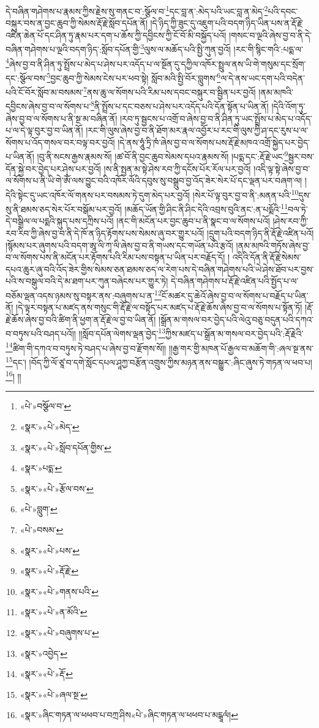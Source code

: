 དེ་བཞིན་གཤེགས་པ་རྣམས་ཀྱིས་རྗེས་སུ་གནང་བ་:སྩོལ་བ་\footnote{«པེ་»བསྩོལ་བ་}དང་བླ་ན་:མེད་པའི་ཡང་བླ་ན་མེད་\footnote{«སྣར་»«པེ་»མེད་}པའི་དབང་བསྐུར་བས་ན་བྱང་ཆུབ་ཀྱི་སེམས་རྡོ་རྗེ་སློབ་དཔོན་ནོ། །དེ་ཉིད་ཀྱི་ཟུང་དུ་འཇུག་པའི་བདག་ཉིད་ཡིན་པས་ན་རྡོ་རྗེ་འཛིན་ཆེན་པོ་དང་ཤིན་ཏུ་རྣམ་པར་དག་པ་ཆོས་ཀྱི་དབྱིངས་ཀྱི་ངོ་བོ་མི་བསྐྱོད་པའོ། །གསང་བ་ལྔའི་ཞེས་བྱ་བ་ནི་དེ་བཞིན་གཤེགས་པ་ལྔའི་བདག་ཉིད་:སློབ་དཔོན་གྱི་\footnote{«སྣར་»«པེ་»སློབ་དཔོན་གྱིས་}ལུས་ལ་མཆོད་པའི་སྤྱི་ཀུན་བྱའོ། །རང་གི་སྙིང་གའི་:པདྨ་ལ་\footnote{«སྣར་»པདྨ་}ཞེས་བྱ་བ་ནི་ཤིན་ཏུ་སྤྲོས་པ་མེད་པ་ཤེས་པར་འདོད་པ་ལ་སྔོན་དུ་དཀྱིལ་འཁོར་སྤྲུལ་ནས་ཡི་གེ་གསུམ་དང་སྲོག་དང་:སྩོལ་བས་\footnote{«སྣར་»«པེ་»རྩོལ་བས་}བྱང་ཆུབ་ཀྱི་སེམས་ངེས་པར་ཕབ་སྟེ། སློབ་མའི་སྤྱི་བོར་བླུགས་\footnote{«པེ་»བླུག་}ལ་དེ་ནས་ཡང་དག་པའི་བདེན་པའི་ངོ་བོར་སློབ་མ་བསམས་\footnote{«པེ་»བསམ་}ནས་ཆུ་ལ་སོགས་པའི་རིམ་པས་དབང་བསྐུར་བ་སྦྱིན་པར་བྱའོ། །ནམ་མཁའི་དབྱིངས་ཞེས་བྱ་བ་ལ་སོགས་པ་\footnote{«སྣར་»«པེ་»པས་}ནི་སྤྲོས་པ་དང་བཅས་པ་ཤེས་པར་འདོད་པའི་དོན་སྟོན་པ་ཡིན་ནོ། །དེའི་འོག་ཏུ་ཞེས་བྱ་བ་ལ་སོགས་པ་ནི་སྔ་མ་བཞིན་ནོ། །རབ་ཏུ་སྦྱངས་པ་འགྲོ་བ་ཞེས་བྱ་བ་ནི་ཤིན་ཏུ་ཡང་སྤྲོས་པ་མེད་པ་འདོད་པ་ལ་དེ་ལྟ་བུར་བྱ་བ་ཡིན་ནོ། །རང་གི་ལུས་ཞེས་བྱ་བ་ནི་ཐོག་མར་རྣལ་འབྱོར་པ་རང་གི་ལུས་ཀྱི་ཤ་དང་རུས་པ་ལ་སོགས་པ་འོད་གསལ་བར་བལྟ་བར་བྱའོ། །དེ་ནས་ཧཱུཾ་ཏྲི་ཁཾ་ཞེས་བྱ་བ་ལ་སོགས་པས་རྡོ་རྗེ་མཁའ་འགྲོ་སྐྱེད་པར་བྱེད་པ་ཡིན་ནོ། །བུ་ནི་སངས་རྒྱས་རྣམས་སོ། །ཚ་བོ་ནི་བྱང་ཆུབ་སེམས་དཔའ་རྣམས་སོ། །པདྨ་དང་:རྡོ་རྗེ་ཡང་\footnote{«སྣར་»«པེ་»རྡོ་རྗེ་}སྦྱར་བས་དོན་སྐྱེ་བར་བྱེད་པར་ཤེས་པར་བྱའོ། །ས་ནི་སྤྱན་མ་སྟེ་ཤེས་རབ་ཀྱི་དངོས་པོར་རོལ་པར་བྱའོ། །འདི་ལྟ་སྟེ་ཞེས་བྱ་བ་ལ་སོགས་པ་ནི་ཡི་གེ་ཨོཾ་ལས་བྱུང་བའི་འཁོར་ལོའི་དབུས་སུ་བསྒྲུབ་བྱ་འོད་ཟེར་སེར་པོ་དང་ལྡན་པར་བཞག་ལ། །དེའི་སྟེང་དུ་ཡང་འཁོར་ལོ་གནས་པར་བསམས་ཏེ་དུག་མེད་པར་བྱའོ། །སེར་པོ་ལྟ་བུར་བྱ་བ་ནི་:མནན་པའི་\footnote{«སྣར་»«པེ་»གནས་པའི་}དུས་སུ་ནི་ཐམས་ཅད་སེར་པོར་བསྒོམ་པར་བྱའོ། །མཆོད་ཡོན་གྱི་ཤིང་ནི་ཤིང་དེའི་འབྲས་བུའི་ནང་:ན་པདྨོའི་\footnote{«སྣར་»«པེ་»ན་མོའི་}བལ་ཏེ་དེ་བསྒྲིལ་ལ་པདྨའི་སྐུད་པས་དཀྲིས་པའོ། །ནང་གི་མངོན་པར་བྱང་ཆུབ་པ་ནི་སྣང་བ་ལ་སོགས་པའོ། །ཤེས་རབ་ཀྱི་རབ་རིབ་ཀྱི་ཞེས་བྱ་བ་ནི་དེ་ཁོ་ན་ཉིད་རྟོགས་པས་སེམས་ཞུ་བར་གྱུར་པའོ། །དྲུག་པའི་བདག་ཉིད་ནི་རྡོ་རྗེ་འཛིན་པའོ། །སྙོམས་པར་ཞུགས་པའི་བདག་ཨཱ་ལི་ཀཱ་ལི་ཞེས་བྱ་བ་ནི་གཡས་དང་གཡོན་པའི་རྩའོ། །ནམ་མཁའི་གཏོས་ཞེས་བྱ་བ་ལ་སོགས་པས་ནི་མངོན་པར་རྟོགས་པའི་རིམ་པས་བསྟན་པ་ཡིན་པར་བརྗོད་དོ། །
འདིའི་དོན་ནི་རྡོ་རྗེ་སེམས་དཔའ་ཆུར་ཞུ་བའི་འོད་ཟེར་གྱིས་སེམས་ཅན་ཐམས་ཅད་ལ་རེག་པས་དེ་བཞིན་གཤེགས་པའི་ཡེ་ཤེས་ཐོབ་པར་བྱས་པའི་ས་བསྒུལ་བའི་དེ་མ་ཐག་པར་ཀུན་བཞེངས་པར་གྱུར་ཏེ། དེ་བཞིན་གཤེགས་པ་རྡོ་རྗེ་འཛིན་པའི་སྤྱོད་པ་ལ་བཅོམ་ལྡན་འདས་ཉམས་སུ་བསྟར་ནས་:བཞུགས་པ་ན་\footnote{«སྣར་»«པེ་»བཞུགས་པ་}ངོ་མཚར་དུ་ཆེའོ་ཞེས་བྱ་བ་ལ་སོགས་པ་བརྗོད་པ་ཡིན་ནོ། །དེ་ལྟར་བསྟན་པ་མཛད་ནས་གསུང་གི་རྡོ་རྗེ་ལ་བསྟོད་པར་མཛད་པ་རྡོ་རྗེ་ཆོས་ཞེས་བྱ་བ་ལ་སོགས་པ་སྟོན་ཏོ། །རྡོ་རྗེ་ཆོས་ཞེས་བྱ་བའི་ཚིག་ནི་ཕྱག་ན་རྡོ་རྗེ་ལ་བྱ་བ་ཡིན་ནོ། །སྒྲོན་མ་གསལ་བར་བྱེད་པའི་ལེའུ་བཅུ་བདུན་པའི་དཀའ་བ་བཏུས་པའི་བཤད་པའོ།། །།སློབ་དཔོན་ལེགས་ལྡན་བྱེད་\footnote{«སྣར་»འབྱེད་}ཀྱིས་མཛད་པ་སྒྲོན་མ་གསལ་བར་བྱེད་པའི་:རྡོ་རྗེའི་\footnote{«སྣར་»«པེ་»རྡོ་}ཚིག་གི་དཀའ་བ་བཏུས་ཏེ་བཤད་པ་ཞེས་བྱ་བ་རྫོགས་སོ།། །།རྒྱ་གར་གྱི་མཁན་པོ་རྒྱལ་བ་མཆོག་གི་:ཞལ་སྔ་ནས་\footnote{«སྣར་»«པེ་»ཞལ་སྔ་}དང་། །བོད་ཀྱི་ལོ་ཙཱ་བ་དགེ་སློང་དཔལ་ཤཱཀྱ་བརྩོན་འགྲུས་ཀྱིས་མཉན་ནས་བསྒྱུར་:ཞིང་ཞུས་ཏེ་གཏན་ལ་ཕབ་པ།\footnote{«སྣར་»ཞིང་གཏན་ལ་ཕཕབ་པ་བཀྲ་ཤིས«པེ་»ཞིང་གཏན་ལ་ཕཕབ་པ་མངྒཱལཾ།}། །།